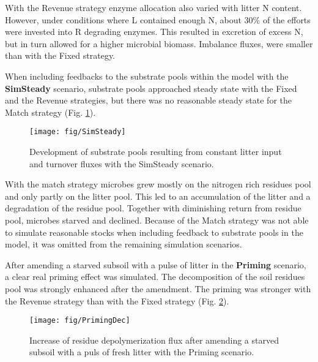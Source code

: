 With the Revenue strategy enzyme allocation also varied with litter N content.
However, under conditions where L contained enough N, about 30\% of the efforts
were invested into R degrading enzymes. This resulted in excretion of
excess N, but in turn allowed for a higher microbial biomass. Imbalance fluxes,
were smaller than with the Fixed strategy.

When including feedbacks to the substrate pools within the model with the
\textbf{SimSteady} scenario, substrate pools approached steady state with the
Fixed and the Revenue strategies, but there was no reasonable steady state for
the Match strategy (Fig. \ref{fig:SimSteady}).

\begin{figure}[t]
\vspace*{2mm}
\begin{center}
\texttt{[image: fig/SimSteady]}
\end{center}
\caption{Development of substrate pools resulting from constant litter input and
turnover fluxes with the SimSteady scenario.
\label{fig:SimSteady}}
\end{figure}

With the match strategy microbes grew mostly on the
nitrogen rich residues pool and only partly on the litter pool. This led to an
accumulation of the litter and a degradation of the residue pool. Together with
diminishing return from residue pool, microbes starved and declined.
Because of the Match strategy was not able to simulate reasonable
stocks when including feedback to substrate pools in the model, it was omitted
from the remaining simulation scenarios.

After amending a starved subsoil with a pulse of litter in the
\textbf{Priming} scenario, a clear real priming effect was simulated. The
decomposition of the soil residues pool was strongly enhanced after the
amendment. The priming was stronger with the Revenue strategy than with the
Fixed strategy (Fig. \ref{fig:PrimingDec}). 

\begin{figure}[t]
\vspace*{2mm}
\begin{center}
\texttt{[image: fig/PrimingDec]}
\end{center}
\caption{Increase of residue depolymerization flux after amending a starved
subsoil with a puls of fresh litter with the Priming scenario.
\label{fig:PrimingDec}}
\end{figure}

